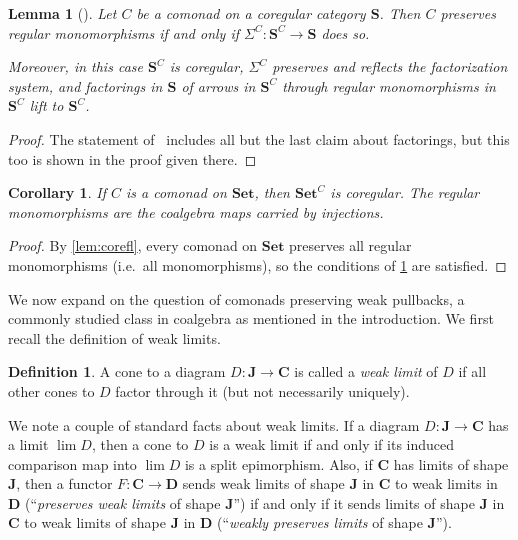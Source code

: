 \documentclass[11pt, oneside, article]{memoir}
\theoremstyle{plain}
\newtheorem{corollary}[theorem]{Corollary}
\newtheorem{lemma}[theorem]{Lemma}
\theoremstyle{definition}
\newtheorem{definition}[def]{Definition}
\theoremstyle{remark}
\newcommand{\namedcat}[1]{\mathbf{#1}}
\newcommand{\cat}[1]{\mathbf{#1}}
\newcommand{\Set}{\namedcat{Set}}
\newcommand{\CoalgOn}[2]{{#2}^{#1}}
\newcommand{\CoalgSet}[1]{\CoalgOn{#1}{\Set}}
\newcommand{\CoalgS}[1]{\CoalgOn{#1}{\bS}}
\newcommand{\carr}{\Sigma}
\newcommand{\car}[1]{\carr^{#1}}
\newcommand{\carC}{\car{\cC}}
\newcommand{\cmnd}[1]{{#1}}
\newcommand{\cC}{\cmnd{C}}
\newcommand{\bC}{\cat{C}}
\newcommand{\bD}{\cat{D}}
\newcommand{\bJ}{\cat{J}}
\newcommand{\bS}{\cat{S}}
\newcommand{\CSet}{\CoalgSet{\cC}}
\newcommand{\CS}{\CoalgS{\cC}}
\begin{document}
\begin{lemma}[{\cite[Regular Categories, Theorem 2.2]{barr-grillet-osdol}}]\label{lem:coregular}\label{lem:factor}
  Let $\cC$ be a comonad on a coregular category $\bS$. Then $\cC$
  preserves regular monomorphisms if and only if
  $\carC \colon \CS \to \bS$ does so.

  Moreover, in this case $\CS$ is coregular, $\carC$ preserves and
  reflects the factorization system, and factorings in $\bS$ of arrows
  in $\CS$ through regular monomorphisms in $\CS$ lift to $\CS$.
\end{lemma}
\begin{proof}
  The statement of~\cite[Regular Categories, Theorem
  2.2]{barr-grillet-osdol} includes all but the last claim about
  factorings, but this too is shown in the proof given there.
\end{proof}

\begin{corollary}\label{lem:regularmono}
  If $\cC$ is a comonad on $\Set$, then $\CSet$ is coregular. The
  regular monomorphisms are the coalgebra maps carried by injections.
\end{corollary}
\begin{proof}
  By \cref{lem:corefl}, every comonad on $\Set$ preserves all
  regular monomorphisms (i.e.\ all monomorphisms), so the conditions
  of \cref{lem:coregular} are satisfied.
\end{proof}

We now expand on the question of comonads preserving weak pullbacks, a
commonly studied class in coalgebra as mentioned in the
introduction. We first recall the definition of weak limits.

\begin{definition}
  A cone to a diagram $D \colon \bJ \to \bC$ is called a
  \emph{weak limit} of $D$ if all other cones to $D$ factor through it
  (but not necessarily uniquely).
\end{definition}

We note a couple of standard facts about weak limits. If a diagram
$D \colon \bJ \to \bC$ has a limit $\lim D$, then a cone to $D$ is a
weak limit if and only if its induced comparison map into $\lim D$ is
a split epimorphism.  Also, if $\bC$ has limits of shape $\bJ$, then a
functor $F \colon \bC \to \bD$ sends weak limits of shape $\bJ$ in
$\bC$ to weak limits in $\bD$ (``\emph{preserves weak limits} of shape
$\bJ$'') if and only if it sends limits of shape $\bJ$ in $\bC$ to
weak limits of shape $\bJ$ in $\bD$ (``\emph{weakly preserves limits}
of shape $\bJ$'').
\end{document}

